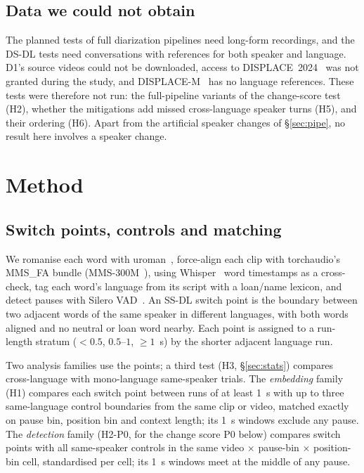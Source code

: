 \documentclass[conference]{IEEEtran}
\begin{document}
\subsection{Data we could not obtain}
\label{sec:data-conv}
The planned tests of full diarization pipelines need long-form recordings, and the
DS-DL tests need conversations with references for both speaker and language. D1's source
videos could not be downloaded, access to DISPLACE~2024~\cite{displace2024} was not granted
during the study, and DISPLACE-M~\cite{displacem2026} has no language references. These
tests were therefore not run: the full-pipeline variants of the change-score test (H2), whether the mitigations add missed cross-language speaker turns (H5), and their ordering (H6).  Apart from the
artificial speaker changes of \S\ref{sec:pipe}, no result here involves a speaker change.

\section{Method}
\label{sec:method}
\subsection{Switch points, controls and matching}
We romanise each word with uroman~\cite{hermjakob2018uroman}, force-align each clip with
torchaudio's MMS\_FA bundle (MMS-300M~\cite{pratap2023mms}), using
Whisper~\cite{radford2023whisper} word timestamps as a cross-check, tag each word's language
from its script with a loan/name lexicon, and detect pauses with Silero
VAD~\cite{silero2021vad}. An SS-DL switch point is the boundary between two adjacent words of
the same speaker in different languages, with both words aligned and no neutral or loan word
nearby. Each point is assigned to a run-length stratum ($<0.5$, $0.5$--$1$, $\geq 1$~s) by
the shorter adjacent language run.

Two analysis families use the points; a third test (H3, \S\ref{sec:stats}) compares cross-language with mono-language same-speaker trials. The \emph{embedding} family (H1) compares each switch
point between runs of at least 1~s with up to three same-language control boundaries from
the same clip or video, matched exactly on pause bin, position bin and context length; its
1~s windows exclude any pause. The \emph{detection} family (H2-P0, for the change score P0 below) compares switch points
with all same-speaker controls in the same video $\times$ pause-bin $\times$ position-bin
cell, standardised per cell; its 1~s windows meet at the middle of any pause.
\end{document}
